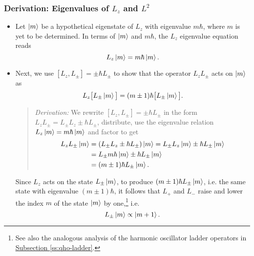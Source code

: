 \documentclass[11pt, a4paper]{article}
\begin{document}
\subsubsection{Derivation: Eigenvalues of $ L_{z} $ and $ L^{2} $}
\begin{itemize}

	
	\item Let $ \ket{m} $ be a hypothetical eigenstate of $ L_{z} $ with eigenvalue $ m \hbar $, where $ m $ is yet to be determined. In terms of $ \ket{m} $ and $ m \hbar $, the $ L_{z} $ eigenvalue equation reads
	\begin{equation*}
		L_{z}\ket{m} = m \hbar \ket{m}.
	\end{equation*}
	
    \item Next, we use $ [L_{z}, L_{\pm}] = \pm \hbar L_{\pm} $ to show that the operator $ L_{z}L_{\pm} $ acts on $ \ket{m} $ as
    \begin{equation*}
        L_{z} \big[ L_{\pm} \ket{m} \big] = (m \pm 1)\hbar \big[ L_{\pm}\ket{m} \big].
    \end{equation*}
    \begin{quote}
        \textit{Derivation:} We rewrite $ [L_{z}, L_{\pm}] = \pm \hbar L_{\pm} $ in the form $ L_{z}L_{\pm} = L_{\pm}L_{z} \pm \hbar L_{\pm} $, distribute, use the eigenvalue relation $ L_{z}\ket{m} = m \hbar \ket{m} $ and factor to get
        \begin{align*}
            L_{z}L_{\pm} \ket{m} &= (L_{\pm}L_{z} \pm \hbar L_{\pm})\ket{m} = L_{\pm} L_{z}\ket{m} \pm \hbar L_{\pm}\ket{m}\\
            & = L_{\pm} m \hbar \ket{m} \pm \hbar L_{\pm}\ket{m}\\
            & = (m \pm 1)\hbar L_{\pm}\ket{m}.
        \end{align*}
    \end{quote}
    Since $ L_{z} $ acts on the state $ L_{\pm}\ket{m} $,  to produce $ (m \pm 1)\hbar L_{\pm}\ket{m} $, i.e. the same state with eigenvalue $ (m \pm 1)\hbar $, it follows that $ L_{+} $ and $ L_{-} $ raise and lower the index $ m $ of the state $ \ket{m} $ by one,\footnote{See also the analogous analysis of the harmonic oscillator ladder operators in \hyperref[ss:qho-ladder]{\underline{Subsection \ref{ss:qho-ladder}}}.} i.e. 
	\begin{equation*}
		L_{\pm} \ket{m} \propto \ket{m+1}.
	\end{equation*}
	

\end{itemize}
\end{document}
